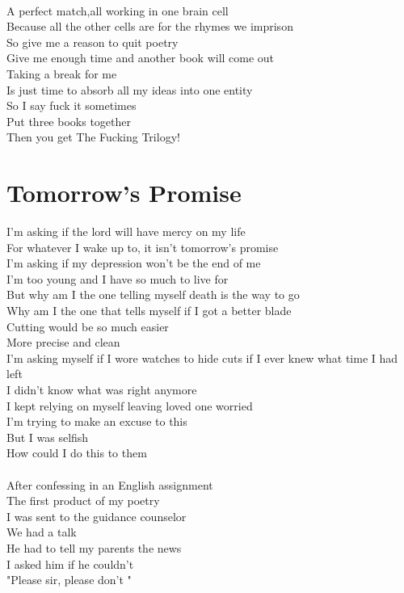 \documentclass[12pt, b5paper, oneside]{book}
\begin{document}
\\A perfect match,all working in one brain cell
\\Because all the other cells are for the rhymes we imprison
\\So give me a reason to quit poetry
\\Give me enough time and another book will come out
\\Taking a break for me
\\Is just time to absorb all my ideas into one entity
\\So I say fuck it sometimes
\\Put three books together
\\Then you get The Fucking Trilogy! 
\newpage
\section{Tomorrow's Promise}
I'm asking if the lord will have mercy on my life
\\For whatever I wake up to, it isn't tomorrow's promise
\\I'm asking if my depression won't be the end of me
\\I'm too young and I have so much to live for
\\But why am I the one telling myself death is the way to go
\\Why am I the one that tells myself if I got a better blade
\\Cutting would be so much easier
\\More precise and clean
\\I'm asking myself if I wore watches to hide cuts if I ever knew what time I had left
\\I didn't know what was right anymore
\\I kept relying on myself leaving loved one worried
\\I'm trying to make an excuse to this
\\But I was selfish
\\How could I do this to them
%
\\\\After confessing in an English assignment
\\The first product of my poetry
\\I was sent to the guidance counselor
\\We had a talk
\\He had to tell my parents the news
\\I asked him if he couldn't
\\"Please sir, please don't "
\end{document}
